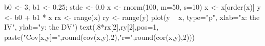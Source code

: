 \begin{Schunk}
\begin{Sinput}
 b0 <- 3; b1 <- 0.25; stde <- 0.0
 x <- rnorm(100, m=50, s=10)
 x <- x[order(x)]
 y <- b0 + b1 * x
 rx <- range(x)
 ry <- range(y)
 plot(y ~ x, type="p", xlab="x: the IV", ylab="y: the DV")
 text(.8*rx[2],ry[2],pos=1, paste("Cov[x,y]=",round(cov(x,y),2),"\n r=",round(cor(x,y),2)))
\end{Sinput}
\end{Schunk}
